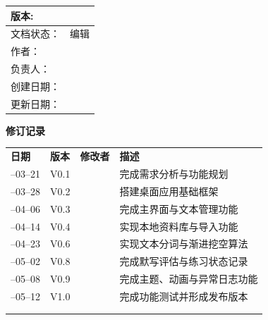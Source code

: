 \maketitle

\vspace{10cm}


\begin{table}[H]
\centering
\renewcommand{\arraystretch}{1.0}
\begin{tabular}{|m{}|p{}|}
	\hline\noalign{\vskip-\dimexpr\doublerulesep+\arrayrulewidth\relax}
	版本: & \Version \\
	\hline
	文档状态： & 编辑 \\
	\hline
	作者： & \Authors \\
	\hline
	负责人： & \Authors \\
	\hline
	创建日期： & \CreatDate \\
	\hline
	更新日期： & \UpdateDate \\
	\hline
\end{tabular}
\end{table}

\newpage

\begin{center}
	\textbf{修订记录}
	\vspace{-1em}
\end{center}

\begin{table}[H]
\centering
\renewcommand{\arraystretch}{1.25}
\setlength{\tabcolsep}{0pt}
\setlength{\dashlinedash}{1pt}
\setlength{\dashlinegap}{2pt}
\begin{tabular}{
	|>{\centering\arraybackslash}p{}:
	>{\centering\arraybackslash}p{0.14\textwidth}:		>{\centering\arraybackslash}p{0.2\textwidth}:
	>{\centering\arraybackslash}p{0.4\textwidth}|
	}
	\hline
	\textbf{日期} & \textbf{版本} & \textbf{修改者} & \textbf{描述} \\
	--03--21 & V0.1 & \Authors & 完成需求分析与功能规划 \\
	--03--28 & V0.2 & \Authors & 搭建桌面应用基础框架 \\
	--04--06 & V0.3 & \Authors & 完成主界面与文本管理功能 \\
	--04--14 & V0.4 & \Authors & 实现本地资料库与导入功能 \\
	--04--23 & V0.6 & \Authors & 实现文本分词与渐进挖空算法 \\
	--05--02 & V0.8 & \Authors & 完成默写评估与练习状态记录 \\
	--05--08 & V0.9 & \Authors & 完成主题、动画与异常日志功能 \\
	--05--12 & V1.0 & \Authors & 完成功能测试并形成发布版本 \\
	\hdashline
	&  &  &  \\
	\hdashline
	&  &  &  \\
	\hline
\end{tabular}
\end{table}


\newpage

\tableofcontents

\newpage
